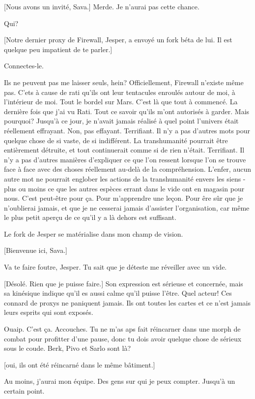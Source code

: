[Nous avons un invité, Sava.] Merde. Je n'aurai pas cette chance. 

Qui? 

[Notre dernier proxy de Firewall, Jesper, a envoyé un fork béta de lui. Il est quelque peu impatient de te parler.] 

Connectes-le. 

Ils ne peuvent pas me laisser seuls, hein? Officiellement, Firewall n'existe même pas. C'ets à cause de rati qu'ils ont leur tentacules enroulés autour de moi, à l'intérieur de moi. Tout le bordel sur Mars. C'est là que tout à commencé. La dernière fois que j'ai vu Rati. Tout ce savoir qu'ils m'ont autorisés à garder. Mais pourquoi? Jusqu'à ce jour, je n'avait jamais réalisé à quel point l'univers était réellement effrayant. Non, pas effayant. Terrifiant. Il n'y a pas d'autres mots pour quelque chose de si vaste, de si indifférent. La transhumanité pourrait être entièrement détruite, et tout continuerait comme si de rien n'était. Terrifiant. Il n'y a pas d'autres manières d'expliquer ce que l'on ressent lorsque l'on se trouve face à face avec des choses réellement au-delà de la compréhension. L'enfer, aucun autre mot ne pourrait englober les actions de la transhumanité envers les siens - plus ou moins ce que les autres espèces errant dans le vide ont en magasin pour nous. C'est peut-être pour ça. Pour m'apprendre une leçon. Pour êre sûr que je n'oublierai jamais, et que je ne cesserai jamais d'assister l'organisation, car même le plus petit aperçu de ce qu'il y a là dehors est suffisant. 

Le fork de Jesper se matérialise dans mon champ de vision. 

[Bienvenue ici, Sava.] 

Va te faire foutre, Jesper. Tu sait que je déteste me réveiller avec un vide. 

[Désolé. Rien que je puisse faire.] Son expression est sérieuse et concernée, mais sa kinésique indique qu'il es aussi calme qu'il puisse l'être. Quel acteur! Ces connard de proxys ne paniquent jamais. Ils ont toutes les cartes et ce n'est jamais leurs esprits qui sont exposés. 

Ouaip. C'est ça. Accouches. Tu ne m'as aps fait réincarner dans une morph de combat pour profitter d'une pause, donc tu dois avoir quelque chose de sérieux sous le coude. Berk, Pivo et Sarlo sont là? 

[oui, ils ont été réincarné dans le même bâtiment.] 

Au moins, j'aurai mon équipe. Des gens sur qui je peux compter. Jusqu'à un certain point. 

